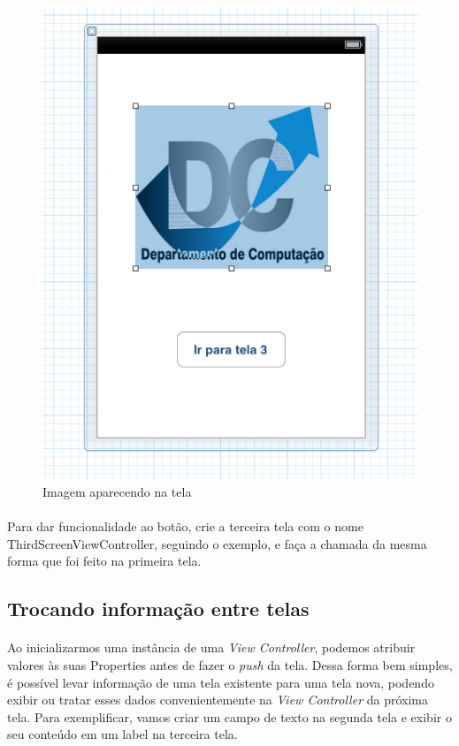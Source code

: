 \documentclass[a4paper,12pt,brazil,doubleside]{book}
\begin{document}
\begin{figure}[!h]
  \centering
  \includegraphics[totalheight=0.25\textheight]{../figuras/ios/2/xib2_tela2.png}
  \caption{Imagem aparecendo na tela}
  \label{fig:a}
\end{figure}

\paragraph{}Para dar funcionalidade ao botão, crie a terceira tela com o nome ThirdScreenViewController, seguindo o exemplo, e faça a chamada da mesma forma que foi feito na primeira tela.

\bigskip

\subsection{Trocando informação entre telas}

\paragraph{}Ao inicializarmos uma instância de uma \emph{View Controller}, podemos atribuir valores às suas Properties antes de fazer o \emph{push} da tela. Dessa forma bem simples, é possível levar informação de uma tela existente para uma tela nova, podendo exibir ou tratar esses dados convenientemente na \emph{View Controller} da próxima tela. Para exemplificar, vamos criar um campo de texto na segunda tela e exibir o seu conteúdo em um label na terceira tela.
\end{document}
